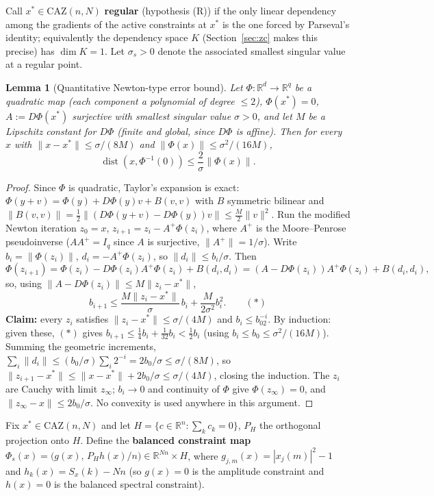 \documentclass[11pt]{article}
\theoremstyle{plain}
\newtheorem{lemma}[theorem]{Lemma}
\theoremstyle{definition}
\theoremstyle{remark}
\newcommand{\R}{\mathbb R}
\newcommand{\CAZ}{\mathrm{CAZ}}
\newcommand{\dist}{\operatorname{dist}}
\begin{document}
Call $x^*\in\CAZ(n,N)$ \textbf{regular} (hypothesis (R)) if the only
linear dependency among the gradients of the active constraints at $x^*$
is the one forced by Parseval's identity; equivalently the dependency
space $K$ (Section~\ref{sec:zc} makes this precise) has $\dim K=1$. Let
$\sigma_s>0$ denote the associated smallest singular value at a regular
point.

\begin{lemma}[Quantitative Newton-type error bound]\label{lem:newton}
Let $\Phi:\R^d\to\R^q$ be a quadratic map (each component a polynomial of
degree $\le2$), $\Phi(x^*)=0$, $A:=D\Phi(x^*)$ surjective with smallest
singular value $\sigma>0$, and let $M$ be a Lipschitz constant for $D\Phi$
(finite and global, since $D\Phi$ is affine). Then for every $x$ with
$\|x-x^*\|\le\sigma/(8M)$ and $\|\Phi(x)\|\le\sigma^2/(16M)$,
$$\dist(x,\Phi^{-1}(0))\le\frac2\sigma\|\Phi(x)\|.$$
\end{lemma}
\begin{proof}
Since $\Phi$ is quadratic, Taylor's expansion is exact:
$\Phi(y+v)=\Phi(y)+D\Phi(y)v+B(v,v)$ with $B$ symmetric bilinear and
$\|B(v,v)\|=\tfrac12\|(D\Phi(y+v)-D\Phi(y))v\|\le\tfrac M2\|v\|^2$. Run the
modified Newton iteration $z_0=x$, $z_{i+1}=z_i-A^+\Phi(z_i)$, where $A^+$
is the Moore--Penrose pseudoinverse ($AA^+=I_q$ since $A$ is surjective,
$\|A^+\|=1/\sigma$). Write $b_i=\|\Phi(z_i)\|$, $d_i=-A^+\Phi(z_i)$, so
$\|d_i\|\le b_i/\sigma$. Then
$$\Phi(z_{i+1})=\Phi(z_i)-D\Phi(z_i)A^+\Phi(z_i)+B(d_i,d_i)=(A-D\Phi(z_i))A^+\Phi(z_i)+B(d_i,d_i),$$
so, using $\|A-D\Phi(z_i)\|\le M\|z_i-x^*\|$,
$$b_{i+1}\le\frac{M\|z_i-x^*\|}\sigma\,b_i+\frac M{2\sigma^2}b_i^2.\qquad(*)$$
\textbf{Claim:} every $z_i$ satisfies $\|z_i-x^*\|\le\sigma/(4M)$ and
$b_i\le b_02^{-i}$. By induction: given these, $(*)$ gives
$b_{i+1}\le\tfrac14b_i+\tfrac1{32}b_i<\tfrac12b_i$ (using
$b_i\le b_0\le\sigma^2/(16M)$). Summing the geometric increments,
$\sum_i\|d_i\|\le(b_0/\sigma)\sum_i2^{-i}=2b_0/\sigma\le\sigma/(8M)$, so
$\|z_{i+1}-x^*\|\le\|x-x^*\|+2b_0/\sigma\le\sigma/(4M)$, closing the
induction. The $z_i$ are Cauchy with limit $z_\infty$; $b_i\to0$ and
continuity of $\Phi$ give $\Phi(z_\infty)=0$, and $\|z_\infty-x\|\le2b_0/\sigma$.
No convexity is used anywhere in this argument.
\end{proof}

Fix $x^*\in\CAZ(n,N)$ and let $H=\{c\in\R^n:\sum_kc_k=0\}$, $P_H$ the
orthogonal projection onto $H$. Define the \textbf{balanced constraint map}
$\Phi_s(x)=\bigl(g(x),\,P_Hh(x)/n\bigr)\in\R^{Nn}\times H$, where
$g_{j,m}(x)=|x_j(m)|^2-1$ and $h_k(x)=S_x(k)-Nn$ (so $g(x)=0$ is the
amplitude constraint and $h(x)=0$ is the balanced spectral constraint).
\end{document}
